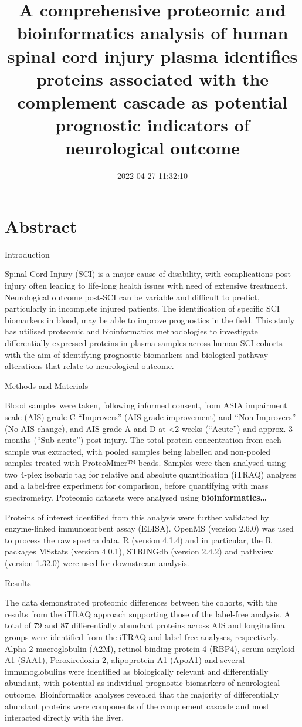 \documentclass[9pt,lineno]{elife}
\title{A comprehensive proteomic and bioinformatics analysis of human spinal cord injury plasma identifies proteins associated with the complement cascade as potential prognostic indicators of neurological outcome}
\author{}
\date{2022-04-27 11:32:10}
\begin{document}
\maketitle

\hypertarget{abstract}{%
\section{Abstract}\label{abstract}}

Introduction

Spinal Cord Injury (SCI) is a major cause of disability, with complications post-injury often leading to life-long health issues with need of extensive treatment. Neurological outcome post-SCI can be variable and difficult to predict, particularly in incomplete injured patients. The identification of specific SCI biomarkers in blood, may be able to improve prognostics in the field. This study has utilised proteomic and bioinformatics methodologies to investigate differentially expressed proteins in plasma samples across human SCI cohorts with the aim of identifying prognostic biomarkers and biological pathway alterations that relate to neurological outcome.

Methods and Materials

Blood samples were taken, following informed consent, from ASIA impairment scale (AIS) grade C ``Improvers'' (AIS grade improvement) and ``Non-Improvers'' (No AIS change), and AIS grade A and D at \textless2 weeks (``Acute'') and approx. 3 months (``Sub-acute'') post-injury. The total protein concentration from each sample was extracted, with pooled samples being labelled and non-pooled samples treated with ProteoMiner™ beads. Samples were then analysed using two 4-plex isobaric tag for relative and absolute quantification (iTRAQ) analyses and a label-free experiment for comparison, before quantifying with mass spectrometry. Proteomic datasets were analysed using \textbf{bioinformatics\ldots{}}

Proteins of interest identified from this analysis were further validated by enzyme-linked immunosorbent assay (ELISA).
OpenMS (version 2.6.0) was used to process the raw spectra data.
R (version 4.1.4) and in particular, the R packages MSstats (version 4.0.1), STRINGdb (version 2.4.2) and pathview (version 1.32.0) were used for downstream analysis.

Results

The data demonstrated proteomic differences between the cohorts, with the results from the iTRAQ approach supporting those of the label-free analysis. A total of 79 and 87 differentially abundant proteins across AIS and longitudinal groups were identified from the iTRAQ and label-free analyses, respectively. Alpha-2-macroglobulin (A2M), retinol binding protein 4 (RBP4), serum amyloid A1 (SAA1), Peroxiredoxin 2, alipoprotein A1 (ApoA1) and several immunoglobulins were identified as biologically relevant and differentially abundant, with potential as individual prognostic biomarkers of neurological outcome. Bioinformatics analyses revealed that the majority of differentially abundant proteins were components of the complement cascade and most interacted directly with the liver.
\end{document}
